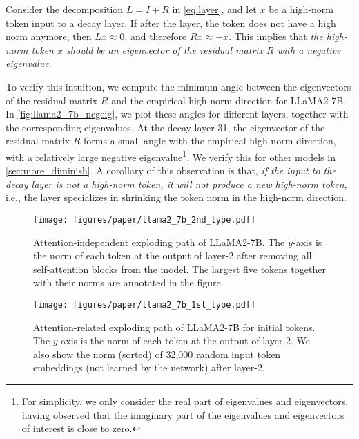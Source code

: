 Consider the decomposition \(L=I+R\) in \cref{eq:layer}, and let \(x\) be a high-norm token input to a decay layer.
If after the layer, the token does not have a high norm anymore, then \(Lx\approx 0\), and therefore \(Rx\approx -x\).
This implies that \emph{the high-norm token \(x\) should be an eigenvector of the residual matrix \(R\) with a negative eigenvalue}.

To verify this intuition, we compute the minimum angle between the eigenvectors of the residual matrix \(R\) and the empirical high-norm direction for LLaMA2-7B.
In \cref{fig:llama2_7b_negeig}, we plot these angles for different layers, together with the corresponding eigenvalues.
At the decay layer-31, the eigenvector of the residual matrix \(R\) forms a small angle with the empirical high-norm direction, with a relatively large negative eigenvalue\footnote{
For simplicity, we only consider the real part of eigenvalues and eigenvectors, having observed that the imaginary part of the eigenvalues and eigenvectors of interest is close to zero.}.
We verify this for other models in \cref{sec:more_diminish}.
A corollary of this observation is that, \emph{if the input to the decay layer is not a high-norm token, it will not produce a new high-norm token},
i.e., the layer specializes in shrinking the token norm in the high-norm direction.

\begin{figure}[t]
    \begin{center}
        \centerline{\texttt{[image: figures/paper/llama2\_7b\_2nd\_type.pdf]}}
    \vspace{-0.5em}
    \caption{Attention-independent exploding path of LLaMA2-7B.
            The \(y\)-axis is the norm of each token at the output of layer-2 after removing all self-attention blocks from the model.
            The largest five tokens together with their norms are annotated in the figure.
        }\label{fig:llama2_7b_noattn}
        \vspace{-1.5em}
    \end{center}
\end{figure}

\begin{figure}[t]
    \begin{center}
        \centerline{\texttt{[image: figures/paper/llama2\_7b\_1st\_type.pdf]}}
    \vspace{-0.5em}
    \caption{Attention-related exploding path of LLaMA2-7B for initial tokens.
            The \(y\)-axis is the norm of each token at the output of layer-2.
            We also show the norm (sorted) of 32,000 random input token embeddings (not learned by the network) after layer-2.
        }\label{fig:llama2_7b_withattn}
    \vspace{-1.5em}
\end{center}
\end{figure}

